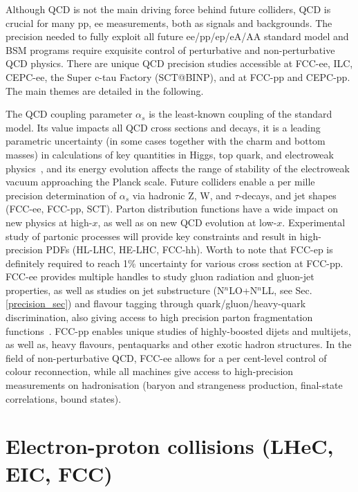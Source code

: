 Although QCD is not the main driving force behind future colliders, QCD is
crucial for many pp, ee measurements, both as signals and backgrounds. The
precision needed to fully exploit all future ee/pp/ep/eA/AA standard model and
BSM programs require exquisite control of perturbative and
non-perturbative QCD physics. There are unique QCD precision studies accessible
at FCC-ee, ILC,  CEPC-ee, the Super c-tau Factory (SCT@BINP), and at FCC-pp and CEPC-pp. The main
themes are detailed in the following.

The QCD coupling parameter $\alpha_s$ is the least-known coupling of the
standard model. Its value impacts all QCD cross sections and decays, it is
a leading parametric uncertainty (in some cases together with the charm
and bottom masses) in calculations of key quantities in Higgs, top quark, and
electroweak physics~\cite{dEnterria:2019its}, and
its energy evolution affects the range of stability of the electroweak vacuum
approaching the Planck scale.
Future colliders enable a per
mille precision determination of $\alpha_s$ via hadronic Z, W, and
$\tau$-decays, and jet shapes (FCC-ee, FCC-pp, SCT).
%
Parton distribution functions have a wide impact on new physics at high-$x$, as
well as on new QCD evolution at low-$x$. Experimental study of partonic
processes will provide key constraints and result in high-precision PDFs
(HL-LHC, HE-LHC, FCC-hh). Worth to note that FCC-ep is definitely required
to reach 1\% uncertainty for various cross section at FCC-pp.
%
FCC-ee provides multiple handles to study gluon radiation and gluon-jet
properties, as well as studies on jet substructure (N$^n$LO+N$^n$LL, see Sec. \ref{precision_sec}) and flavour
tagging through quark/gluon/heavy-quark discrimination, also giving access to
high precision parton fragmentation functions~\cite{Anderle:2017qwx}. FCC-pp enables unique studies of
highly-boosted dijets and multijets, as well as,  heavy flavours,  pentaquarks and other exotic hadron structures.
%
In the field of non-perturbative QCD, FCC-ee allows for a per cent-level
control of colour reconnection, while all machines give access to
high-precision measurements on hadronisation (baryon and strangeness
production, final-state correlations, bound states).


\section{Electron-proton collisions (LHeC, EIC, FCC)}
\label{epcoll}


